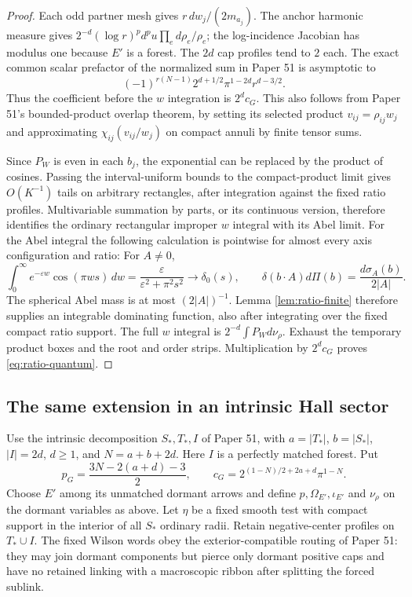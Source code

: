 \begin{proof}
Each odd partner mesh gives $r\,dw_j/(2m_{a_j})$. The anchor harmonic
measure gives $2^{-d}(\log r)^p d^pu\prod_e d\rho_e/\rho_e$;
the log-incidence Jacobian has modulus one because $E'$ is a forest.
The $2d$ cap profiles tend to $2$ each. The exact common scalar
prefactor of the normalized sum in Paper 51 is asymptotic to
\[
 (-1)^{r(N-1)}2^{d+1/2}\pi^{1-2d}r^{d-3/2}.
\]
Thus the coefficient before the $w$ integration is $2^d c_G$.
This also follows from Paper 51's bounded-product overlap theorem,
by setting its selected product $v_{ij}=\rho_{ij}w_j$ and approximating
$\chi_{ij}(v_{ij}/w_j)$ on compact annuli by finite tensor sums.

Since $P_W$ is even in each $b_j$, the exponential can be replaced
by the product of cosines. Passing the interval-uniform bounds to
the compact-product limit gives $O(K^{-1})$ tails on arbitrary
rectangles, after integration against the fixed ratio profiles.
Multivariable summation by parts, or its continuous version, therefore
identifies the ordinary rectangular improper $w$ integral with its
Abel limit. For the Abel integral the following calculation is
pointwise for almost every axis configuration and ratio:
For $A\ne0$,
\[
 \int_0^\infty e^{-\varepsilon w}\cos(\pi ws)\,dw
      =\frac{\varepsilon}{\varepsilon^2+\pi^2s^2}
      \longrightarrow\delta_0(s),\qquad
 \delta(b\cdot A)d\Pi(b)=\frac{d\sigma_A(b)}{2|A|}.
\]
The spherical Abel mass is at most $(2|A|)^{-1}$. Lemma
\ref{lem:ratio-finite} therefore supplies an integrable dominating
function, also after integrating over the fixed compact ratio support.
The full $w$ integral is $2^{-d}\int P_Wd\nu_\rho$. Exhaust the
temporary product boxes and the root and order strips. Multiplication
by $2^dc_G$ proves \eqref{eq:ratio-quantum}.
\end{proof}

\subsection{The same extension in an intrinsic Hall sector}
Use the intrinsic decomposition $S_*,T_*,I$ of Paper 51, with
$a=|T_*|$, $b=|S_*|$, $|I|=2d$, $d\ge1$, and $N=a+b+2d$.
Here $I$ is a perfectly matched forest. Put
\[
 p_G=\frac{3N-2(a+d)-3}{2},\qquad
 c_G=2^{(1-N)/2+2a+d}\pi^{1-N}.
\]
Choose $E'$ among its unmatched dormant arrows and define
$p,\Omega_{E'},\iota_{E'}$ and $\nu_\rho$ on the dormant variables
as above. Let $\eta$ be a fixed smooth test with compact support
in the interior of all $S_*$ ordinary radii. Retain negative-center
profiles on $T_*\cup I$. The fixed Wilson words obey the
exterior-compatible routing of Paper 51: they may join dormant
components but pierce only dormant positive caps and have no retained
linking with a macroscopic ribbon after splitting the forced sublink.

